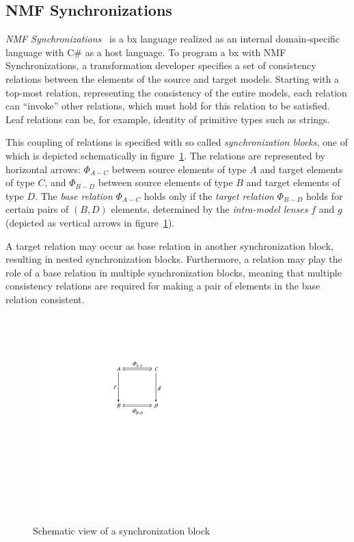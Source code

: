 \subsection{NMF Synchronizations}
\label{sec:NMF}

\emph{NMF Synchronizations}~\cite{SoSyM2017-Hinkel} is a bx language realized as an internal domain-specific language with C\# as a host language.
To program a bx with NMF Synchronizations, a transformation developer specifies a set of consistency relations between the elements of the source and target models.
Starting with a top-most relation, representing the consistency of the entire models, each relation can ``invoke'' other relations, which must hold for this relation to be satisfied.
Leaf relations can be, for example, identity of primitive types such as strings.

This coupling of relations is specified with so called \emph{synchronization blocks},  one of which is depicted schematically in figure~\ref{fig:SynchronizationBlock}.
The relations are represented by horizontal arrows: $\varPhi_{A-C}$ between source elements of type $A$ and target elements of type $C$, and $\varPhi_{B-D}$ between source elements of type $B$ and target elements of type $D$.
The \emph{base relation}  $\varPhi_{A-C}$ holds only if the \emph{target relation} $\varPhi_{B-D}$ holds for certain pairs of $(B,D)$ elements, determined by the \emph{intra-model lenses} $f$ and $g$ (depicted as vertical arrows in figure~\ref{fig:SynchronizationBlock}).

A target relation may occur as base relation in another synchronization block, resulting in nested synchronization blocks.
Furthermore, a relation may play the role of a base relation in multiple synchronization blocks, meaning that multiple consistency relations are required for making a pair of elements in the base relation consistent.

\begin{figure}[b!]
	\centering
	\includegraphics[width=0.35\columnwidth]{diagrams/solutions/NMFSynchronizationBlock}
	\caption{Schematic view of a synchronization block}
	\label{fig:SynchronizationBlock}
\end{figure}

